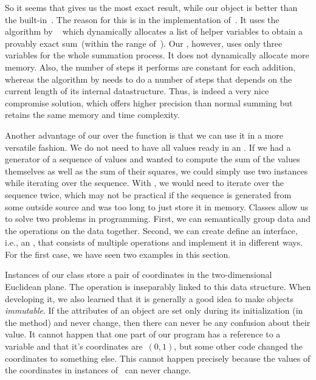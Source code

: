 So it seems that  gives us the most exact result, while our  object is better than the built-in~.
The reason for this is in the implementation of~.
It uses the algorithm by \citeauthor{S1997APFPAAFRGP}~\cite{S1997APFPAAFRGP,H2005BFPSATFPPR} which dynamically allocates a list of helper variables to obtain a provably exact sum~(within the range of~).
Our , however, uses only three variables for the whole summation process.
It does not dynamically allocate more memory.
Also, the number of steps it performs are constant for each addition, whereas the algorithm by \citeauthor{S1997APFPAAFRGP} needs to do a number of steps that depends on the current length of its internal datastructure.
Thus,  is indeed a very nice compromise solution, which offers higher precision than normal summing but retains the same memory and time complexity.

Another advantage of our  over the function  is that we can use it in a more versatile fashion.
We do not need to have all values ready in an .
If we had a generator of a sequence of values and wanted to compute the sum of the values themselves as well as the sum of their squares, we could simply use two instances  while iterating over the sequence.
With , we would need to iterate over the sequence twice, which may not be practical if the sequence is generated from some outside source and was too long to just store it in memory.%
%
\endhsection%
%
%
Classes allow us to solve two problems in programming.
First, we can semantically group data and the operations on the data together.
Second, we can create define an interface, i.e., an , that consists of multiple operations and implement it in different ways.
For the first case, we have seen two examples in this section.

Instances of our  class store a pair of coordinates in the two-dimensional Euclidean plane.
The operation  is inseparably linked to this data structure.
When developing it, we also learned that it is generally a good idea to make objects \emph{immutable}.
If the attributes of an object are set only during its initialization (in the  method) and never change, then there can never be any confusion about their value.
It cannot happen that one part of our program has a reference to a  variable and  that it's coordinates are~$(0,1)$, but some other code changed the coordinates to something else.
This cannot happen precisely because the values of the coordinates in instances of~ can never change.

